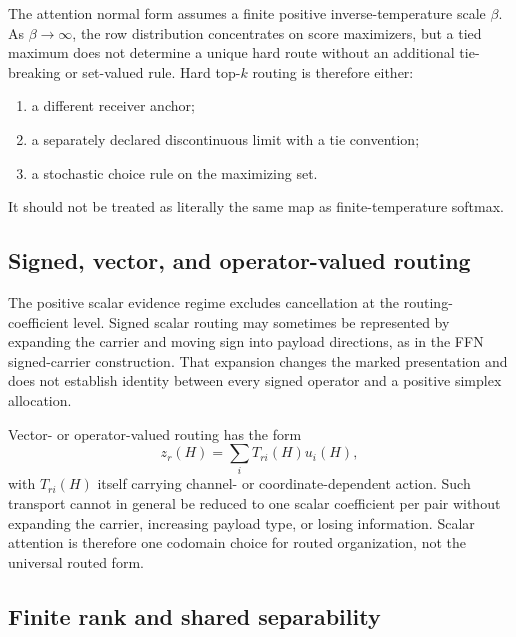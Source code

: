 The attention normal form assumes a finite positive inverse-temperature scale $\beta$. As $\beta\to\infty$, the row distribution concentrates on score maximizers, but a tied maximum does not determine a unique hard route without an additional tie-breaking or set-valued rule. Hard top-$k$ routing is therefore either:
\begin{enumerate}[label=(\roman*)]
\item a different receiver anchor;
\item a separately declared discontinuous limit with a tie convention;
\item a stochastic choice rule on the maximizing set.
\end{enumerate}
It should not be treated as literally the same map as finite-temperature softmax.

\subsection{Signed, vector, and operator-valued routing}

The positive scalar evidence regime excludes cancellation at the routing-coefficient level. Signed scalar routing may sometimes be represented by expanding the carrier and moving sign into payload directions, as in the FFN signed-carrier construction. That expansion changes the marked presentation and does not establish identity between every signed operator and a positive simplex allocation.

Vector- or operator-valued routing has the form
\[
z_r(H)
=
\sum_i T_{ri}(H)u_i(H),
\]
with $T_{ri}(H)$ itself carrying channel- or coordinate-dependent action. Such transport cannot in general be reduced to one scalar coefficient per pair without expanding the carrier, increasing payload type, or losing information. Scalar attention is therefore one codomain choice for routed organization, not the universal routed form.

\subsection{Finite rank and shared separability}


